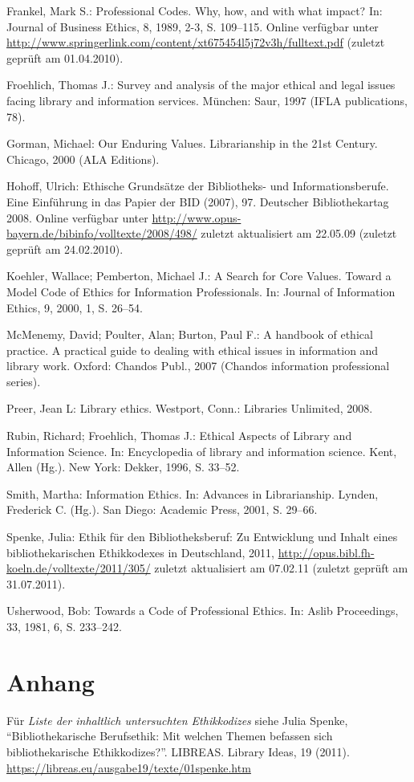 \documentclass[output=paper]{langscibook}
\begin{document}
Frankel, Mark S.: Professional Codes. Why, how, and with what impact?
In: Journal of Business Ethics, 8, 1989, 2-3, S. 109--115. Online
verfügbar unter
\url{http://www.springerlink.com/content/xt675454l5j72v3h/fulltext.pdf}
(zuletzt geprüft am 01.04.2010).

Froehlich, Thomas J.: Survey and analysis of the major ethical and legal
issues facing library and information services. München: Saur, 1997
(IFLA publications, 78).

Gorman, Michael: Our Enduring Values. Librarianship in the 21st Century.
Chicago, 2000 (ALA Editions).

Hohoff, Ulrich: Ethische Grundsätze der Bibliotheks- und
Informationsberufe. Eine Einführung in das Papier der BID (2007), 97.
Deutscher Bibliothekartag 2008. Online verfügbar unter
\url{http://www.opus-bayern.de/bibinfo/volltexte/2008/498/} zuletzt
aktualisiert am 22.05.09 (zuletzt geprüft am 24.02.2010).

Koehler, Wallace; Pemberton, Michael J.: A Search for Core Values.
Toward a Model Code of Ethics for Information Professionals. In: Journal
of Information Ethics, 9, 2000, 1, S. 26--54.

McMenemy, David; Poulter, Alan; Burton, Paul F.: A handbook of ethical
practice. A practical guide to dealing with ethical issues in
information and library work. Oxford: Chandos Publ., 2007 (Chandos
information professional series).

Preer, Jean L: Library ethics. Westport, Conn.: Libraries Unlimited,
2008.

Rubin, Richard; Froehlich, Thomas J.: Ethical Aspects of Library and
Information Science. In: Encyclopedia of library and information
science. Kent, Allen (Hg.). New York: Dekker, 1996, S. 33--52.

Smith, Martha: Information Ethics. In: Advances in Librarianship.
Lynden, Frederick C. (Hg.). San Diego: Academic Press, 2001, S. 29--66.

Spenke, Julia: Ethik für den Bibliotheksberuf: Zu Entwicklung und Inhalt
eines bibliothekarischen Ethikkodexes in Deutschland, 2011,
\url{http://opus.bibl.fh-koeln.de/volltexte/2011/305/} zuletzt
aktualisiert am 07.02.11 (zuletzt geprüft am 31.07.2011).

Usherwood, Bob: Towards a Code of Professional Ethics. In: Aslib
Proceedings, 33, 1981, 6, S. 233--242.

\hypertarget{anhang}{%
\section*{Anhang}\label{anhang}}

Für \emph{Liste der inhaltlich untersuchten Ethikkodizes} siehe Julia
Spenke, \enquote{Bibliothekarische Berufsethik: Mit welchen Themen
befassen sich bibliothekarische Ethikkodizes?}. LIBREAS. Library Ideas,
19 (2011). \url{https://libreas.eu/ausgabe19/texte/01spenke.htm}
\end{document}
